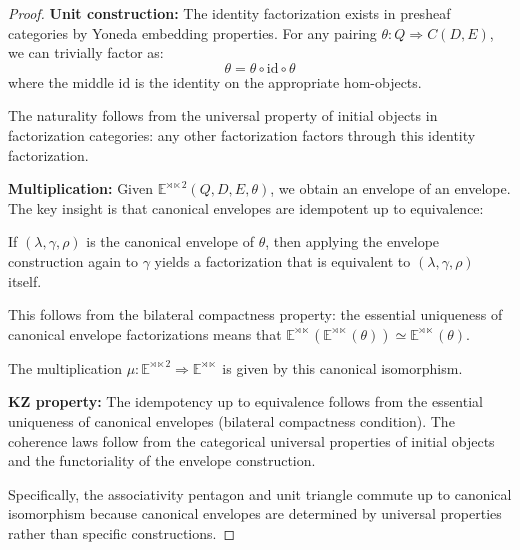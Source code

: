 \documentclass[11pt]{article}
\theoremstyle{plain}
\theoremstyle{definition}
\theoremstyle{remark}
\newcommand{\id}{\mathrm{id}}
\newcommand{\Pair}{\mathrm{Pair}}
\begin{document}
\begin{proof}
\textbf{Unit construction:} The identity factorization exists in presheaf categories by Yoneda embedding properties. For any pairing $\theta : Q \Rightarrow C(D, E)$, we can trivially factor as:
$$
\theta = \theta \circ \id \circ \theta
$$
where the middle $\id$ is the identity on the appropriate hom-objects.

The naturality follows from the universal property of initial objects in factorization categories: any other factorization factors through this identity factorization.

\textbf{Multiplication:} Given $\mathbb{E}^{\rtimes \ltimes 2}(Q, D, E, \theta)$, we obtain an envelope of an envelope. The key insight is that canonical envelopes are idempotent up to equivalence:

If $(\lambda, \gamma, \rho)$ is the canonical envelope of $\theta$, then applying the envelope construction again to $\gamma$ yields a factorization that is equivalent to $(\lambda, \gamma, \rho)$ itself.

This follows from the bilateral compactness property: the essential uniqueness of canonical envelope factorizations means that $\mathbb{E}^{\rtimes \ltimes}(\mathbb{E}^{\rtimes \ltimes}(\theta)) \simeq \mathbb{E}^{\rtimes \ltimes}(\theta)$.

The multiplication $\mu : \mathbb{E}^{\rtimes \ltimes 2} \Rightarrow \mathbb{E}^{\rtimes \ltimes}$ is given by this canonical isomorphism.

\textbf{KZ property:} The idempotency up to equivalence follows from the essential uniqueness of canonical envelopes (bilateral compactness condition). The coherence laws follow from the categorical universal properties of initial objects and the functoriality of the envelope construction.

Specifically, the associativity pentagon and unit triangle commute up to canonical isomorphism because canonical envelopes are determined by universal properties rather than specific constructions.
\end{proof}

\begin{center}
\end{center}
\end{document}
